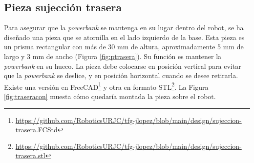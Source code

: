 \subsection{Pieza sujección trasera}

Para asegurar que la \textit{powerbank} se mantenga en su lugar dentro del robot, se ha diseñado una pieza que se atornilla en el lado izquierdo de la base. Esta pieza es un prisma rectangular con más de 30 mm de altura, aproximadamente 5 mm de largo y 3 mm de ancho (Figura \ref{fig:ptrasera}). Su función es mantener la \textit{powerbank} en su hueco. La pieza debe colocarse en posición vertical para evitar que la \textit{powerbank} se deslice, y en posición horizontal cuando se desee retirarla. Existe una versión en FreeCAD\footnote{\url{https://github.com/RoboticsURJC/tfg-jlopez/blob/main/design/sujeccion-trasera.FCStd}} y otra en formato STL\footnote{\url{https://github.com/RoboticsURJC/tfg-jlopez/blob/main/design/sujeccion-trasera.stl}}. La Figura \ref{fig:traseracon} muesta cómo quedaría montada la pieza sobre el robot.

